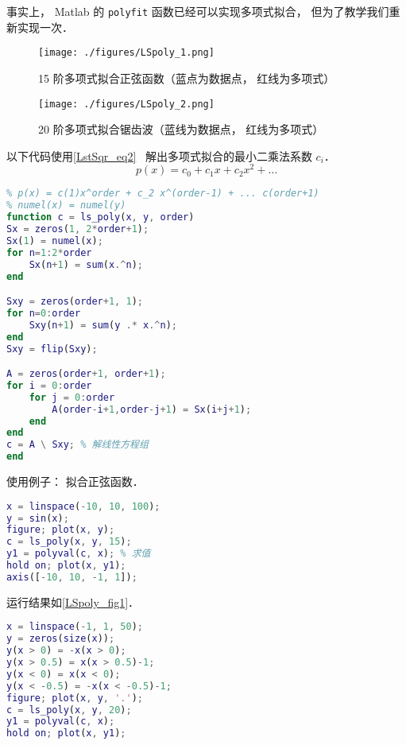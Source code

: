 

事实上， Matlab 的 \verb|polyfit| 函数已经可以实现多项式拟合， 但为了教学我们重新实现一次．
\begin{figure}[ht]
\centering
\texttt{[image: ./figures/LSpoly\_1.png]}
\caption{15 阶多项式拟合正弦函数（蓝点为数据点， 红线为多项式）} \label{LSpoly_fig1}
\end{figure}

\begin{figure}[ht]
\centering
\texttt{[image: ./figures/LSpoly\_2.png]}
\caption{20 阶多项式拟合锯齿波（蓝线为数据点， 红线为多项式）} \label{LSpoly_fig2}
\end{figure}

以下代码使用\autoref{LstSqr_eq2}~ 解出多项式拟合的最小二乘法系数 $c_i$．
\begin{equation}
p(x) = c_0 + c_1 x + c_2 x^2 + \dots
\end{equation}

\begin{lstlisting}[language=matlab, caption=ls\_poly.m]
% 多项式最小二乘法拟合
% p(x) = c(1)x^order + c_2 x^(order-1) + ... c(order+1)
% numel(x) = numel(y)
function c = ls_poly(x, y, order)
Sx = zeros(1, 2*order+1);
Sx(1) = numel(x);
for n=1:2*order
    Sx(n+1) = sum(x.^n);
end

Sxy = zeros(order+1, 1);
for n=0:order
    Sxy(n+1) = sum(y .* x.^n);
end
Sxy = flip(Sxy);

A = zeros(order+1, order+1);
for i = 0:order
    for j = 0:order
        A(order-i+1,order-j+1) = Sx(i+j+1);
    end
end
c = A \ Sxy; % 解线性方程组
end
\end{lstlisting}

使用例子： 拟合正弦函数．
\begin{lstlisting}[language=matlab, caption=ls\_poly\_demo.m]
% ls_poly_demo
x = linspace(-10, 10, 100);
y = sin(x);
figure; plot(x, y);
c = ls_poly(x, y, 15);
y1 = polyval(c, x); % 求值
hold on; plot(x, y1);
axis([-10, 10, -1, 1]);
\end{lstlisting}
运行结果如\autoref{LSpoly_fig1}．

\begin{lstlisting}[language=matlab, caption=ls\_poly\_demo2.m]
% ls_poly_demo2
x = linspace(-1, 1, 50);
y = zeros(size(x));
y(x > 0) = -x(x > 0);
y(x > 0.5) = x(x > 0.5)-1;
y(x < 0) = x(x < 0);
y(x < -0.5) = -x(x < -0.5)-1;
figure; plot(x, y, '.');
c = ls_poly(x, y, 20);
y1 = polyval(c, x);
hold on; plot(x, y1);
\end{lstlisting}
